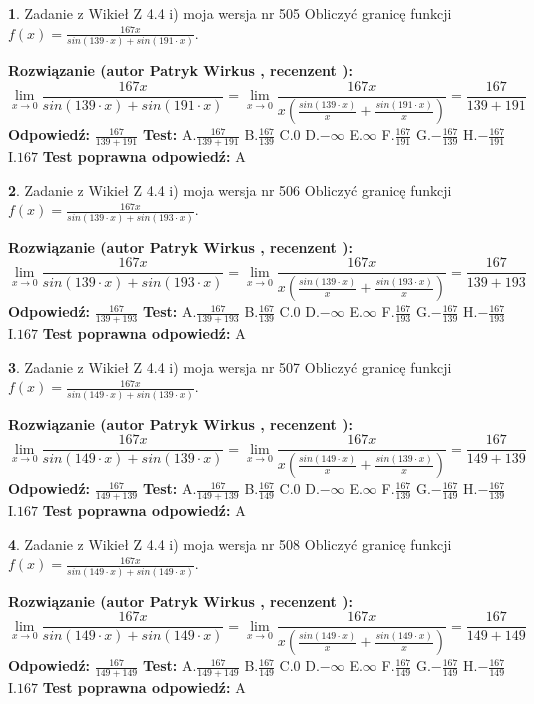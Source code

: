 \documentclass[12pt, a4paper]{article}
\theoremstyle{definition} %
\newtheorem{zad}{}
\newcommand{\zadStart}[1]{\begin{zad}#1\newline}
\newcommand{\zadStop}{\end{zad}}
\newcommand{\rozwStart}[2]{\noindent \textbf{Rozwiązanie (autor #1 , recenzent #2): }\newline}
\newcommand{\rozwStop}{\newline}
\newcommand{\odpStart}{\noindent \textbf{Odpowiedź:}\newline}
\newcommand{\odpStop}{\newline}
\newcommand{\testStart}{\noindent \textbf{Test:}\newline}
\newcommand{\testStop}{\newline}
\newcommand{\kluczStart}{\noindent \textbf{Test poprawna odpowiedź:}\newline}
\newcommand{\kluczStop}{\newline}
\begin{document}
\zadStart{Zadanie z Wikieł Z 4.4 i) moja wersja nr 505}
Obliczyć granicę funkcji $f(x)=\frac{167x}{sin(139\cdot x) +sin(191\cdot x)}$.
\zadStop
\rozwStart{Patryk Wirkus}{}
$$\lim\limits_{x\to 0}\frac{167x}{sin(139\cdot x) +sin(191\cdot x)}=\lim\limits_{x\to 0}\frac{167x}{x(\frac{sin(139\cdot x)}{x}+\frac{sin(191\cdot x)}{x})}=\frac{167}{139+191}$$
\rozwStop
\odpStart
$\frac{167}{139+191}$
\odpStop
\testStart
A.$\frac{167}{139+191}$
B.$\frac{167}{139}$
C.$0$
D.$-\infty$
E.$\infty$
F.$\frac{167}{191}$
G.$-\frac{167}{139}$
H.$-\frac{167}{191}$
I.$167$
\testStop
\kluczStart
A
\kluczStop



\zadStart{Zadanie z Wikieł Z 4.4 i) moja wersja nr 506}
Obliczyć granicę funkcji $f(x)=\frac{167x}{sin(139\cdot x) +sin(193\cdot x)}$.
\zadStop
\rozwStart{Patryk Wirkus}{}
$$\lim\limits_{x\to 0}\frac{167x}{sin(139\cdot x) +sin(193\cdot x)}=\lim\limits_{x\to 0}\frac{167x}{x(\frac{sin(139\cdot x)}{x}+\frac{sin(193\cdot x)}{x})}=\frac{167}{139+193}$$
\rozwStop
\odpStart
$\frac{167}{139+193}$
\odpStop
\testStart
A.$\frac{167}{139+193}$
B.$\frac{167}{139}$
C.$0$
D.$-\infty$
E.$\infty$
F.$\frac{167}{193}$
G.$-\frac{167}{139}$
H.$-\frac{167}{193}$
I.$167$
\testStop
\kluczStart
A
\kluczStop



\zadStart{Zadanie z Wikieł Z 4.4 i) moja wersja nr 507}
Obliczyć granicę funkcji $f(x)=\frac{167x}{sin(149\cdot x) +sin(139\cdot x)}$.
\zadStop
\rozwStart{Patryk Wirkus}{}
$$\lim\limits_{x\to 0}\frac{167x}{sin(149\cdot x) +sin(139\cdot x)}=\lim\limits_{x\to 0}\frac{167x}{x(\frac{sin(149\cdot x)}{x}+\frac{sin(139\cdot x)}{x})}=\frac{167}{149+139}$$
\rozwStop
\odpStart
$\frac{167}{149+139}$
\odpStop
\testStart
A.$\frac{167}{149+139}$
B.$\frac{167}{149}$
C.$0$
D.$-\infty$
E.$\infty$
F.$\frac{167}{139}$
G.$-\frac{167}{149}$
H.$-\frac{167}{139}$
I.$167$
\testStop
\kluczStart
A
\kluczStop



\zadStart{Zadanie z Wikieł Z 4.4 i) moja wersja nr 508}
Obliczyć granicę funkcji $f(x)=\frac{167x}{sin(149\cdot x) +sin(149\cdot x)}$.
\zadStop
\rozwStart{Patryk Wirkus}{}
$$\lim\limits_{x\to 0}\frac{167x}{sin(149\cdot x) +sin(149\cdot x)}=\lim\limits_{x\to 0}\frac{167x}{x(\frac{sin(149\cdot x)}{x}+\frac{sin(149\cdot x)}{x})}=\frac{167}{149+149}$$
\rozwStop
\odpStart
$\frac{167}{149+149}$
\odpStop
\testStart
A.$\frac{167}{149+149}$
B.$\frac{167}{149}$
C.$0$
D.$-\infty$
E.$\infty$
F.$\frac{167}{149}$
G.$-\frac{167}{149}$
H.$-\frac{167}{149}$
I.$167$
\testStop
\kluczStart
A
\kluczStop
\end{document}
